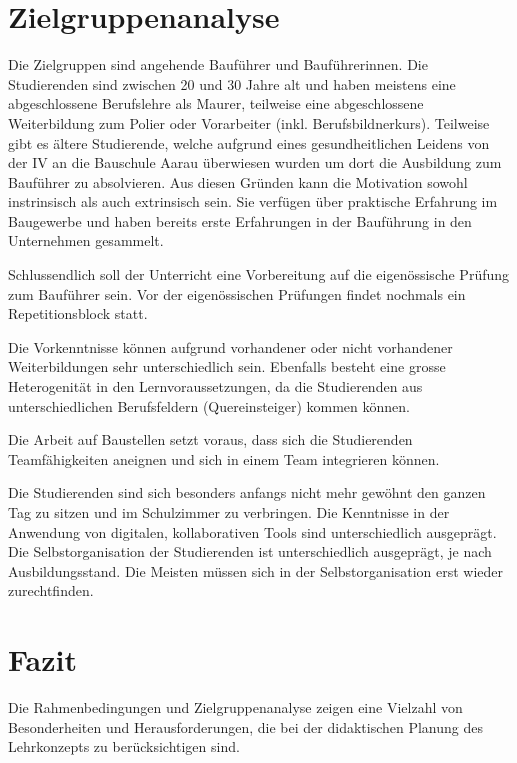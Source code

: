 \documentclass[
11pt,
captions=tableheading,
smallheadings,
headsepline,
footsepline, 
captions=tableheading,
parskip=half-,
]{scrartcl}
\begin{document}
\section{Zielgruppenanalyse}
\label{sec:Zielgruppenanalyse}
Die Zielgruppen sind angehende Bauführer und Bauführerinnen. Die Studierenden sind zwischen 20 und 30 Jahre alt und haben meistens eine abgeschlossene Berufslehre als Maurer, teilweise eine abgeschlossene Weiterbildung zum Polier oder Vorarbeiter (inkl. Berufsbildnerkurs).
Teilweise gibt es ältere Studierende, welche aufgrund eines gesundheitlichen Leidens von der IV an die Bauschule Aarau überwiesen wurden um dort die Ausbildung zum Bauführer zu absolvieren.
Aus diesen Gründen kann die Motivation sowohl instrinsisch als auch extrinsisch sein.
Sie verfügen über praktische Erfahrung im Baugewerbe und haben bereits erste Erfahrungen in der Bauführung in den Unternehmen gesammelt.

Schlussendlich soll der Unterricht eine Vorbereitung auf die eigenössische Prüfung zum Bauführer sein.
Vor der eigenössischen Prüfungen findet nochmals ein Repetitionsblock statt.

Die Vorkenntnisse können aufgrund vorhandener oder nicht vorhandener Weiterbildungen sehr unterschiedlich sein.
Ebenfalls besteht eine grosse Heterogenität in den Lernvoraussetzungen, da die Studierenden aus unterschiedlichen Berufsfeldern (Quereinsteiger) kommen können.

Die Arbeit auf Baustellen setzt voraus, dass sich die Studierenden Teamfähigkeiten aneignen und sich in einem Team integrieren können.

Die Studierenden sind sich besonders anfangs nicht mehr gewöhnt den ganzen Tag zu sitzen und im Schulzimmer zu verbringen.
Die Kenntnisse in der Anwendung von digitalen, kollaborativen Tools sind unterschiedlich ausgeprägt.
Die Selbstorganisation der Studierenden ist unterschiedlich ausgeprägt, je nach Ausbildungsstand.
Die Meisten müssen sich in der Selbstorganisation erst wieder zurechtfinden.

\section*{Fazit}
Die Rahmenbedingungen und Zielgruppenanalyse zeigen eine Vielzahl von Besonderheiten und Herausforderungen, die bei der didaktischen Planung des Lehrkonzepts zu berücksichtigen sind.
\end{document}
